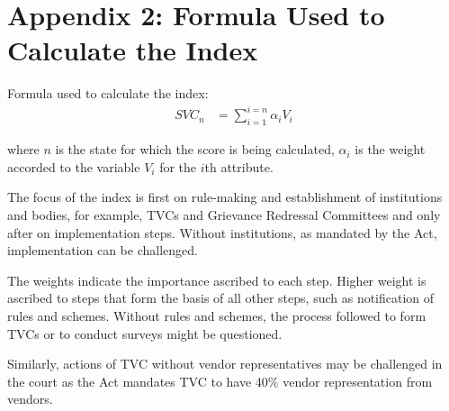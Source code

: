 \documentclass[a4paper, 12pt, twoside]{article}
\begin{document}
{{\begin{landscape}
\begin{longtable}
{\end{longtable}
\end{landscape}


\newpage
\section*{Appendix 2: Formula Used to Calculate the Index}
\label{sec: Appendix 2}
Formula used to calculate the index:
\begin{align*}
SVC_n &= \sum_{i = 1}^{i = n} \alpha_i V_i
\end{align*}

where $n$ is the state for which the score is being calculated, $\alpha_i$ is the weight accorded to the variable $V_i$ for the $i$th attribute.

The focus of the index is first on rule-making and establishment of institutions and bodies, for example, TVCs and Grievance Redressal Committees and only after on implementation steps. Without institutions, as mandated by the Act, implementation can be challenged.

The weights indicate the importance ascribed to each step. Higher weight is ascribed to steps that form the basis of all other steps, such as notification of rules and schemes. Without rules and schemes, the process followed to form TVCs or to conduct surveys might be questioned.

Similarly, actions of TVC without vendor representatives may be challenged in the court as the Act mandates TVC to have 40\% vendor representation from vendors.

}}
\end{document}
